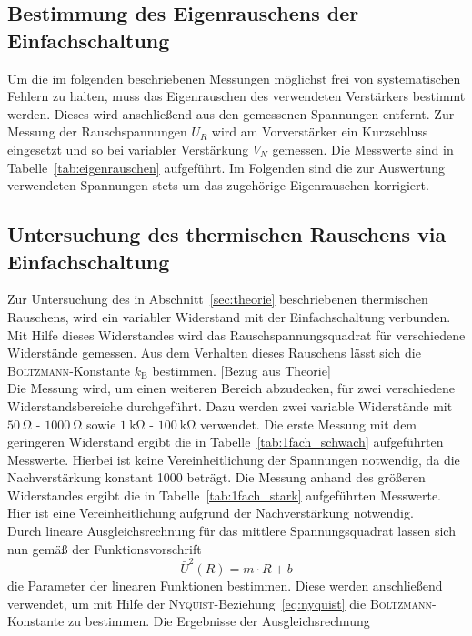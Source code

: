 \subsection{Bestimmung des Eigenrauschens der Einfachschaltung}
%
Um die im folgenden beschriebenen Messungen möglichst frei von systematischen
Fehlern zu halten, muss das Eigenrauschen des verwendeten Verstärkers bestimmt
werden. Dieses wird anschließend aus den gemessenen Spannungen entfernt. Zur
Messung der Rauschspannungen $U_R$ wird am Vorverstärker ein Kurzschluss
eingesetzt und so bei variabler Verstärkung $V_N$ gemessen. Die Messwerte sind
in Tabelle~\ref{tab:eigenrauschen} aufgeführt. Im Folgenden sind die zur
Auswertung verwendeten Spannungen stets um das zugehörige Eigenrauschen
korrigiert.
%
\subsection{Untersuchung des thermischen Rauschens via Einfachschaltung}
%
Zur Untersuchung des in Abschnitt~\ref{sec:theorie} beschriebenen thermischen
Rauschens, wird ein variabler Widerstand mit der Einfachschaltung verbunden. Mit
Hilfe dieses Widerstandes wird das Rauschspannungsquadrat für verschiedene
Widerstände gemessen. Aus dem Verhalten dieses Rauschens lässt sich die
\textsc{Boltzmann}-Konstante $k_\text{B}$ bestimmen. [Bezug aus Theorie] \\
Die Messung wird, um einen weiteren Bereich abzudecken, für zwei verschiedene
Widerstandsbereiche durchgeführt. Dazu werden zwei variable Widerstände mit
$\SI{50}{\ohm}$ - $\SI{1000}{\ohm}$ sowie $\SI{1}{\kilo\ohm}$ -
$\SI{100}{\kilo\ohm}$ verwendet. Die erste Messung mit dem geringeren Widerstand
ergibt die in Tabelle~\ref{tab:1fach_schwach} aufgeführten Messwerte. Hierbei
ist keine Vereinheitlichung der Spannungen notwendig, da die Nachverstärkung
konstant \num{1000} beträgt. Die Messung anhand des größeren Widerstandes ergibt
die in Tabelle~\ref{tab:1fach_stark} aufgeführten Messwerte. Hier ist eine
Vereinheitlichung aufgrund der Nachverstärkung notwendig. \\
Durch lineare Ausgleichsrechnung für das mittlere Spannungsquadrat lassen sich
nun gemäß der Funktionsvorschrift
%
\begin{equation}
  \bar{U}^2(R)=m\cdot R + b
\end{equation}
%
die Parameter der linearen Funktionen bestimmen. Diese werden anschließend
verwendet, um mit Hilfe der \textsc{Nyquist}-Beziehung~\eqref{eq:nyquist} die
\textsc{Boltzmann}-Konstante zu bestimmen. Die Ergebnisse der Ausgleichsrechnung
